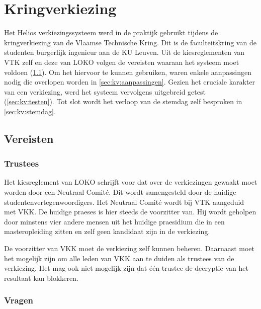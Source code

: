 % 
%

\chapter{Kringverkiezing}
\label{chap:kringverkiezing}

Het Helios verkiezingssysteem werd in de praktijk gebruikt tijdens de kringverkiezing van de Vlaamse Technische Kring. Dit is de faculteitskring van de studenten burgerlijk ingenieur aan de KU Leuven. Uit de kiesreglementen van VTK zelf en deze van LOKO volgen de vereisten waaraan het systeem moet voldoen (\ref{sec:kv:vereisten}). Om het hiervoor te kunnen gebruiken, waren enkele aanpassingen nodig die overlopen worden in \ref{sec:kv:aanpassingen}. Gezien het cruciale karakter van een verkiezing, werd het systeem vervolgens uitgebreid getest (\ref{sec:kv:testen}). Tot slot wordt het verloop van de stemdag zelf besproken in \ref{sec:kv:stemdag}.

\section[Vereisten]{Vereisten~\cite{loko_kiesreglement_verkiezingen}\cite{vtk_verkiezingsreglement}}
\label{sec:kv:vereisten}

\subsection{Trustees}

Het kiesreglement van LOKO schrijft voor dat over de verkiezingen gewaakt moet worden door een Neutraal Comit\'e. Dit wordt samengesteld door de huidige studentenvertegenwoordigers. Het Neutraal Comit\'e wordt bij VTK aangeduid met VKK. De huidige praeses is hier steeds de voorzitter van. Hij wordt geholpen door minstens vier andere mensen uit het huidige praesidium die in een masteropleiding zitten en zelf geen kandidaat zijn in de verkiezing.

\npar De voorzitter van VKK moet de verkiezing zelf kunnen beheren. Daarnaast moet het mogelijk zijn om alle leden van VKK aan te duiden als trustees van de verkiezing. Het mag ook niet mogelijk zijn dat \'e\'en trustee de decryptie van het resultaat kan blokkeren.

\subsection{Vragen}

